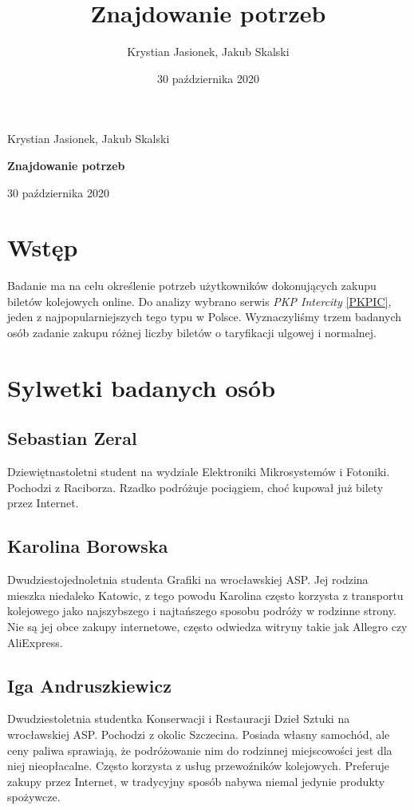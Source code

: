 \documentclass{article}
\date{30 października 2020}
\author{Krystian Jasionek, Jakub Skalski}
\title{Znajdowanie potrzeb}
\begin{document}
\thispagestyle{empty}
\begin{center}
\vspace*{1cm}

\LARGE{Krystian Jasionek, Jakub Skalski}

\vspace{0.5cm}
\Huge\textbf{ Znajdowanie potrzeb}
\vspace{0.5cm}

\large{30 października 2020}
\end{center}

\newpage

\section{Wstęp}
Badanie ma na celu określenie potrzeb użytkowników dokonujących zakupu biletów kolejowych online.
Do analizy wybrano serwis \emph{PKP Intercity} \ref{PKPIC}, jeden z najpopularniejszych tego typu w Polsce.
Wyznaczyliśmy trzem badanych osób zadanie zakupu różnej liczby biletów o taryfikacji ulgowej i normalnej.

\section{Sylwetki badanych osób}
\subsection{Sebastian Zeral}
Dziewiętnastoletni student na wydziale Elektroniki Mikrosystemów i Fotoniki. Pochodzi z Raciborza.
Rzadko podróżuje pociągiem, choć kupował już bilety przez Internet.

\subsection{Karolina Borowska}
Dwudziestojednoletnia studenta Grafiki na wrocławskiej ASP. Jej rodzina mieszka niedaleko Katowic,
z tego powodu Karolina często korzysta z transportu kolejowego jako najszybszego i najtańszego sposobu
podróży w rodzinne strony. Nie są jej obce zakupy internetowe, często odwiedza witryny takie jak Allegro czy AliExpress.

\subsection{Iga Andruszkiewicz}
Dwudziestoletnia studentka Konserwacji i Restauracji Dzieł Sztuki na wrocławskiej ASP. Pochodzi
z okolic Szczecina. Posiada własny samochód, ale ceny paliwa sprawiają, że podróżowanie nim do rodzinnej
miejscowości jest dla niej nieopłacalne. Często korzysta z usług przewoźników kolejowych. Preferuje
zakupy przez Internet, w tradycyjny sposób nabywa niemal jedynie produkty spożywcze.
\end{document}
